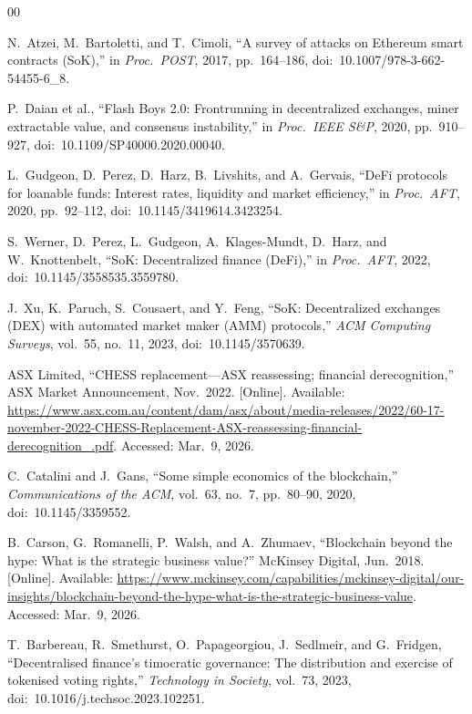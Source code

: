 \documentclass[conference]{IEEEtran}
\begin{document}
\begin{thebibliography}{00}

 N.~Atzei, M.~Bartoletti, and T.~Cimoli, ``A survey of attacks on Ethereum smart contracts (SoK),'' in \textit{Proc.\ POST}, 2017, pp.\ 164--186, doi:~10.1007/978-3-662-54455-6\_8.

 P.~Daian et al., ``Flash Boys 2.0: Frontrunning in decentralized exchanges, miner extractable value, and consensus instability,'' in \textit{Proc.\ IEEE S\&P}, 2020, pp.\ 910--927, doi:~10.1109/SP40000.2020.00040.

 L.~Gudgeon, D.~Perez, D.~Harz, B.~Livshits, and A.~Gervais, ``DeFi protocols for loanable funds: Interest rates, liquidity and market efficiency,'' in \textit{Proc.\ AFT}, 2020, pp.\ 92--112, doi:~10.1145/3419614.3423254.

 S.~Werner, D.~Perez, L.~Gudgeon, A.~Klages-Mundt, D.~Harz, and W.~Knottenbelt, ``SoK: Decentralized finance (DeFi),'' in \textit{Proc.\ AFT}, 2022, doi:~10.1145/3558535.3559780.

 J.~Xu, K.~Paruch, S.~Cousaert, and Y.~Feng, ``SoK: Decentralized exchanges (DEX) with automated market maker (AMM) protocols,'' \textit{ACM Computing Surveys}, vol.~55, no.~11, 2023, doi:~10.1145/3570639.

 ASX Limited, ``CHESS replacement---ASX reassessing; financial derecognition,'' ASX Market Announcement, Nov.\ 2022. [Online]. Available: \url{https://www.asx.com.au/content/dam/asx/about/media-releases/2022/60-17-november-2022-CHESS-Replacement-ASX-reassessing-financial-derecognition_.pdf}. Accessed: Mar.\ 9, 2026.

 C.~Catalini and J.~Gans, ``Some simple economics of the blockchain,'' \textit{Communications of the ACM}, vol.~63, no.~7, pp.\ 80--90, 2020, doi:~10.1145/3359552.

 B.~Carson, G.~Romanelli, P.~Walsh, and A.~Zhumaev, ``Blockchain beyond the hype: What is the strategic business value?'' McKinsey Digital, Jun.\ 2018. [Online]. Available: \url{https://www.mckinsey.com/capabilities/mckinsey-digital/our-insights/blockchain-beyond-the-hype-what-is-the-strategic-business-value}. Accessed: Mar.\ 9, 2026.

 T.~Barbereau, R.~Smethurst, O.~Papageorgiou, J.~Sedlmeir, and G.~Fridgen, ``Decentralised finance's timocratic governance: The distribution and exercise of tokenised voting rights,'' \textit{Technology in Society}, vol.~73, 2023, doi:~10.1016/j.techsoc.2023.102251.


\end{thebibliography}
\end{document}
